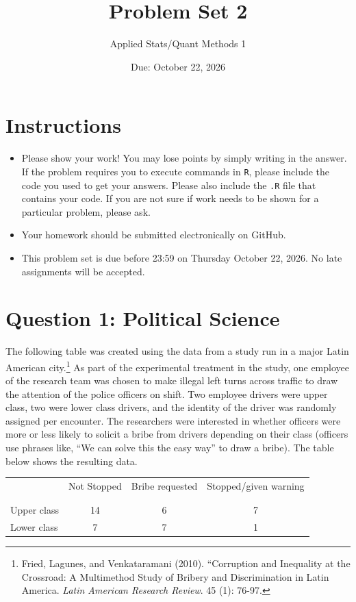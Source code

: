 \documentclass[12pt,letterpaper]{article}
\title{Problem Set 2}
\date{Due: October 22, 2026}
\author{Applied Stats/Quant Methods 1}
\begin{document}
	\maketitle
	\section*{Instructions}
	\begin{itemize}
		\item Please show your work! You may lose points by simply writing in the answer. If the problem requires you to execute commands in \texttt{R}, please include the code you used to get your answers. Please also include the \texttt{.R} file that contains your code. If you are not sure if work needs to be shown for a particular problem, please ask.
		\item Your homework should be submitted electronically on GitHub.
		\item This problem set is due before 23:59 on Thursday October 22, 2026. No late assignments will be accepted.
		
	\end{itemize}
	
	
	\vspace{.5cm}
	\section*{Question 1: Political Science}
	\vspace{.25cm}
	The following table was created using the data from a study run in a major Latin American city.\footnote{Fried, Lagunes, and Venkataramani (2010). ``Corruption and Inequality at the Crossroad: A Multimethod Study of Bribery and Discrimination in Latin America. \textit{Latin American Research Review}. 45 (1): 76-97.} As part of the experimental treatment in the study, one employee of the research team was chosen to make illegal left turns across traffic to draw the attention of the police officers on shift. Two employee drivers were upper class, two were lower class drivers, and the identity of the driver was randomly assigned per encounter. The researchers were interested in whether officers were more or less likely to solicit a bribe from drivers depending on their class (officers use phrases like, ``We can solve this the easy way'' to draw a bribe). The table below shows the resulting data.
	
	\newpage
	\begin{table}[h!]
		\centering
		\begin{tabular}{l | c c c }
			& Not Stopped & Bribe requested & Stopped/given warning \\
			\\[-1.8ex]
			\hline \\[-1.8ex]
			Upper class & 14 & 6 & 7 \\
			Lower class & 7 & 7 & 1 \\
			\hline
		\end{tabular}
	\end{table}
	
\end{document}
